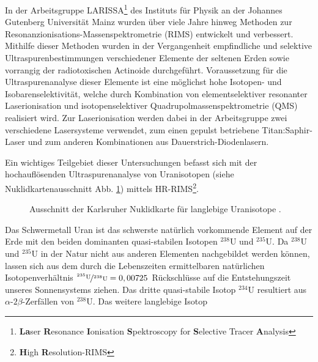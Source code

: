 In der Arbeitsgruppe LARISSA\footnote{\textbf{La}ser \textbf{R}esonance
\textbf{I}onisation \textbf{S}pektroscopy for \textbf{S}elective Tracer
\textbf{A}nalysis} des Instituts für Physik an der Johannes Gutenberg
Universität Mainz wurden über viele Jahre hinweg Methoden zur
Resonanz\-ionisations-Massenspektrometrie (RIMS) entwickelt und verbessert.
Mithilfe dieser Methoden wurden in der Vergangenheit empfindliche und selektive
Ultraspurenbestimmungen verschiedener Elemente der seltenen Erden sowie
vorrangig der radiotoxischen Actinoide durchgeführt. Voraussetzung für die
Ultraspurenanalyse dieser Elemente ist eine möglichst hohe Isotopen- und Isobarenselektivität, welche durch Kombination von elementselektiver resonanter Laserionisation und
isotopenselektiver Quadrupolmassenspektrometrie (QMS) realisiert wird.
Zur Laserionisation werden dabei in der Arbeitsgruppe zwei verschiedene Lasersysteme verwendet, zum einen
gepulst betriebene Titan:Saphir-Laser und zum anderen Kombinationen aus
Dauerstrich-Diodenlasern.\par
Ein wichtiges Teilgebiet dieser Untersuchungen befasst sich mit der
hochauflösenden Ultraspurenanalyse von Uranisotopen (siehe
Nuklidkartenausschnitt Abb.
\ref{fig:uran_nuklidkarte}) mittels HR-RIMS\footnote{\textbf{H}igh
\textbf{R}esolution-RIMS}.
\begin{figure}[h]
 	\centering
	\caption[Gesamter experimenteller Aufbau,
	schematisch]{Ausschnitt der Karlsruher Nuklidkarte für langlebige
	Uranisotope \cite{nuklidkarte}.}\label{fig:uran_nuklidkarte}
\end{figure}
Das Schwermetall Uran ist das schwerste natürlich vorkommende Element auf der
Erde mit den beiden dominanten quasi-stabilen Isotopen $^{238}$U und $^{235}$U.
Da $^{238}$U und $^{235}$U in der Natur nicht aus anderen Elementen nachgebildet werden können, lassen sich aus dem durch die Lebenszeiten ermittelbaren natürlichen Isotopenverhältnis
$\nicefrac{^{235}\text{U}}{^{238}\text{U}}=0,00725$ Rückschlüsse auf die
Entstehungszeit unseres Sonnensystems ziehen. Das dritte quasi-stabile Isotop $^{234}$U resultiert aus
$\alpha$-$2\beta$-Zerfällen von $^{238}$U. Das weitere langlebige Isotop
